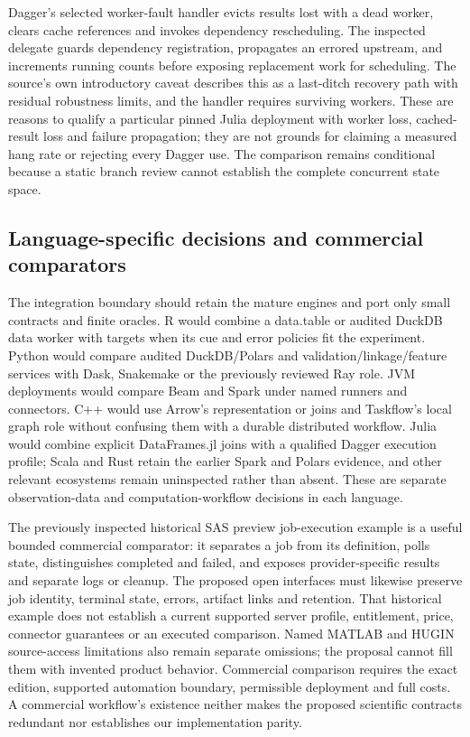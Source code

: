 Dagger's selected worker-fault handler evicts results lost with a dead worker, clears cache references and invokes dependency rescheduling. The inspected delegate guards dependency registration, propagates an errored upstream, and increments running counts before exposing replacement work for scheduling. The source's own introductory caveat describes this as a last-ditch recovery path with residual robustness limits, and the handler requires surviving workers. These are reasons to qualify a particular pinned Julia deployment with worker loss, cached-result loss and failure propagation; they are not grounds for claiming a measured hang rate or rejecting every Dagger use. The comparison remains conditional because a static branch review cannot establish the complete concurrent state space.\citep{exec25_dww_dagger}

\subsection{Language-specific decisions and commercial comparators}

The integration boundary should retain the mature engines and port only small contracts and finite oracles. R would combine a data.table or audited DuckDB data worker with targets when its cue and error policies fit the experiment. Python would compare audited DuckDB/Polars and validation/linkage/feature services with Dask, Snakemake or the previously reviewed Ray role. JVM deployments would compare Beam and Spark under named runners and connectors. C++ would use Arrow's representation or joins and Taskflow's local graph role without confusing them with a durable distributed workflow. Julia would combine explicit DataFrames.jl joins with a qualified Dagger execution profile; Scala and Rust retain the earlier Spark and Polars evidence, and other relevant ecosystems remain uninspected rather than absent. These are separate observation-data and computation-workflow decisions in each language.\citep{exec25_dww_datatable,exec25_dww_targets,exec25_dww_dask,exec25_dww_snakemake,exec25_dww_beam,exec25_dww_arrow,exec25_dww_taskflow,exec25_dww_dataframes,exec25_dww_dagger,exec25_otm_spark,exec25_otm_polars,exec25_dww_choice}

The previously inspected historical SAS preview job-execution example is a useful bounded commercial comparator: it separates a job from its definition, polls state, distinguishes completed and failed, and exposes provider-specific results and separate logs or cleanup. The proposed open interfaces must likewise preserve job identity, terminal state, errors, artifact links and retention. That historical example does not establish a current supported server profile, entitlement, price, connector guarantees or an executed comparison. Named MATLAB and HUGIN source-access limitations also remain separate omissions; the proposal cannot fill them with invented product behavior. Commercial comparison requires the exact edition, supported automation boundary, permissible deployment and full costs. A commercial workflow's existence neither makes the proposed scientific contracts redundant nor establishes our implementation parity.\citep{exec24_workflow_contracts_sas,exec25_dww_choice}

